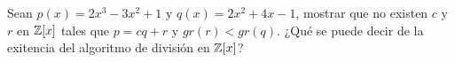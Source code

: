 \item Sean $p(x)=2x^3-3x^2+1$ y $q(x)=2x^2+4x-1$, mostrar que no existen $c$ y $r$ en $\mathbb{Z}[x]$ tales que $p=cq+r$ y $gr(r)<gr(q)$. ¿Qué se puede decir de la exitencia del algoritmo de división en $\mathbb{Z}[x]$?
    \begin{mdframed}[style=s]
        
    \end{mdframed}